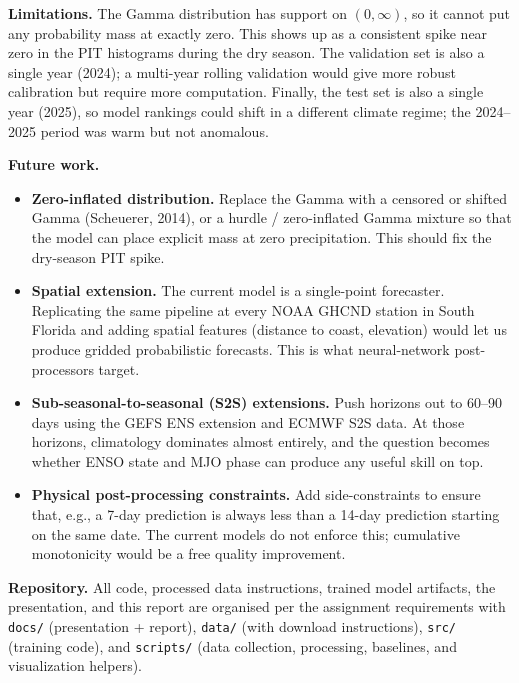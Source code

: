 \documentclass[11pt]{article}
\begin{document}
\textbf{Limitations.} The Gamma distribution has support on $(0, \infty)$, so it cannot put any probability mass at exactly zero. This shows up as a consistent spike near zero in the PIT histograms during the dry season. The validation set is also a single year (2024); a multi-year rolling validation would give more robust calibration but require more computation. Finally, the test set is also a single year (2025), so model rankings could shift in a different climate regime; the 2024--2025 period was warm but not anomalous.

\textbf{Future work.}
\begin{itemize}[leftmargin=1.5em]
    \item \textbf{Zero-inflated distribution.} Replace the Gamma with a censored or shifted Gamma (Scheuerer, 2014), or a hurdle / zero-inflated Gamma mixture so that the model can place explicit mass at zero precipitation. This should fix the dry-season PIT spike.
    \item \textbf{Spatial extension.} The current model is a single-point forecaster. Replicating the same pipeline at every NOAA GHCND station in South Florida and adding spatial features (distance to coast, elevation) would let us produce gridded probabilistic forecasts. This is what neural-network post-processors target.
    \item \textbf{Sub-seasonal-to-seasonal (S2S) extensions.} Push horizons out to 60--90 days using the GEFS ENS extension and ECMWF S2S data. At those horizons, climatology dominates almost entirely, and the question becomes whether ENSO state and MJO phase can produce any useful skill on top.
    \item \textbf{Physical post-processing constraints.} Add side-constraints to ensure that, e.g., a 7-day prediction is always less than a 14-day prediction starting on the same date. The current models do not enforce this; cumulative monotonicity would be a free quality improvement.
\end{itemize}

\textbf{Repository.} All code, processed data instructions, trained model artifacts, the presentation, and this report are organised per the assignment requirements with \texttt{docs/} (presentation + report), \texttt{data/} (with download instructions), \texttt{src/} (training code), and \texttt{scripts/} (data collection, processing, baselines, and visualization helpers).
\end{document}
